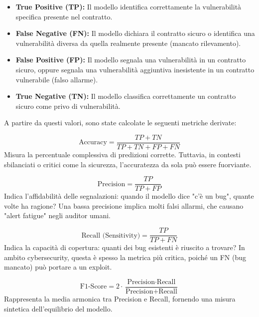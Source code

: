 \begin{itemize}
    \item \textbf{True Positive (TP):} Il modello identifica correttamente la vulnerabilità specifica presente nel contratto.
    \item \textbf{False Negative (FN):} Il modello dichiara il contratto sicuro o identifica una vulnerabilità diversa da quella realmente presente (mancato rilevamento).
    \item \textbf{False Positive (FP):} Il modello segnala una vulnerabilità in un contratto sicuro, oppure segnala una vulnerabilità aggiuntiva inesistente in un contratto vulnerabile (falso allarme).
    \item \textbf{True Negative (TN):} Il modello classifica correttamente un contratto sicuro come privo di vulnerabilità.
\end{itemize}

A partire da questi valori, sono state calcolate le seguenti metriche derivate:

\begin{equation}
    \text{Accuracy} = \frac{TP + TN}{TP + TN + FP + FN}
\end{equation}
Misura la percentuale complessiva di predizioni corrette. Tuttavia, in contesti sbilanciati o critici come la sicurezza, l'accuratezza da sola può essere fuorviante.

\begin{equation}
    \text{Precision} = \frac{TP}{TP + FP}
\end{equation}
Indica l'affidabilità delle segnalazioni: quando il modello dice "c'è un bug", quante volte ha ragione? Una bassa precisione implica molti falsi allarmi, che causano "alert fatigue" negli auditor umani.

\begin{equation}
    \text{Recall (Sensitivity)} = \frac{TP}{TP + FN}
\end{equation}
Indica la capacità di copertura: quanti dei bug esistenti è riuscito a trovare? In ambito cybersecurity, questa è spesso la metrica più critica, poiché un FN (bug mancato) può portare a un exploit.

\begin{equation}
    \text{F1-Score} = 2 \cdot \frac{\text{Precision} \cdot \text{Recall}}{\text{Precision} + \text{Recall}}
\end{equation}
Rappresenta la media armonica tra Precision e Recall, fornendo una misura sintetica dell'equilibrio del modello.

